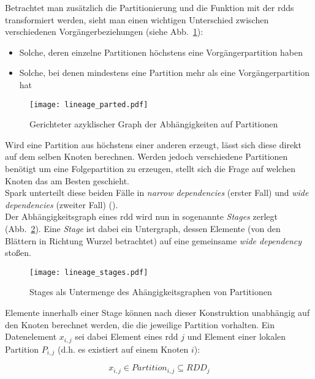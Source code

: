 Betrachtet man zusätzlich die Partitionierung und die Funktion mit der \glspl{rdd} transformiert werden, sieht man einen wichtigen Unterschied zwischen verschiedenen Vorgängerbeziehungen (siehe Abb.~\ref{fig:lineage_parted}):
\begin{itemize}
\item Solche, deren einzelne Partitionen höchstens eine Vorgängerpartition haben
\item Solche, bei denen mindestens eine Partition mehr als eine Vorgängerpartition hat
\end{itemize}

\begin{figure}[ht!]
	\centering
  \texttt{[image: lineage\_parted.pdf]}
	\caption{Gerichteter azyklischer Graph der Abhängigkeiten auf Partitionen}
	\label{fig:lineage_parted}
\end{figure}

Wird eine Partition aus höchstens einer anderen erzeugt, lässt sich diese direkt auf dem selben Knoten berechnen. Werden jedoch verschiedene Partitionen benötigt um eine Folgepartition zu erzeugen, stellt sich die Frage auf welchen Knoten das am Besten geschieht.\\
Spark unterteilt diese beiden Fälle in \textit{narrow dependencies} (erster Fall) und \textit{wide dependencies} (zweiter Fall) (\cite{Mat12}).\\

Der Abhängigkeitsgraph eines \gls{rdd} wird nun in sogenannte \textit{Stages} zerlegt (Abb.~\ref{fig:lineage_stages}). Eine \textit{Stage} ist dabei ein Untergraph, dessen Elemente (von den Blättern in Richtung Wurzel betrachtet) auf eine gemeinsame \textit{wide dependency} stoßen.\\

\begin{figure}[ht!]
	\centering
  \texttt{[image: lineage\_stages.pdf]}
	\caption{Stages als Untermenge des Ahängigkeitsgraphen von Partitionen}
	\label{fig:lineage_stages}
\end{figure}

Elemente innerhalb einer Stage können nach dieser Konstruktion unabhängig auf den Knoten berechnet werden, die die jeweilige Partition vorhalten. Ein Datenelement \(x_{i,j}\) sei dabei Element eines \gls{rdd} \(j\) und Element einer lokalen Partition \(P_{i,j}\) (d.h. es existiert auf einem Knoten \(i\)):

\[x_{i,j} \in Partition_{i,j} \subseteq RDD_j\]

